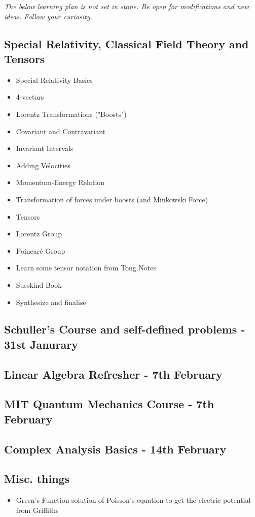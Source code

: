 \textit{The below learning plan is not set in stone. Be open for modifications and new ideas. Follow your curiosity.}
\subsection*{Special Relativity, Classical Field Theory and Tensors}
\begin{itemize}
    \item Special Relativity Basics
    \item 4-vectors
    \item Lorentz Transformations ("Boosts")
    \item Covariant and Contravariant
    \item Invariant Intervals
    \item Adding Velocities
    \item Momentum-Energy Relation
    \item Transformation of forces under boosts (and Minkowski Force)
    \item Tensors
    \item Lorentz Group
    \item Poincaré Group 
    \item Learn some tensor notation from Tong Notes
    \item Susskind Book 
    \item Synthesize and finalise
\end{itemize}
\subsection*{Schuller's Course and self-defined problems - 31st Janurary}
\subsection*{Linear Algebra Refresher - 7th February}
\subsection*{MIT Quantum Mechanics Course - 7th February}
\subsection*{Complex Analysis Basics - 14th February}
\subsection*{Misc. things}
\begin{itemize}
    \item Green's Function solution of Poisson's equation to get the electric potential from Griffiths
\end{itemize}